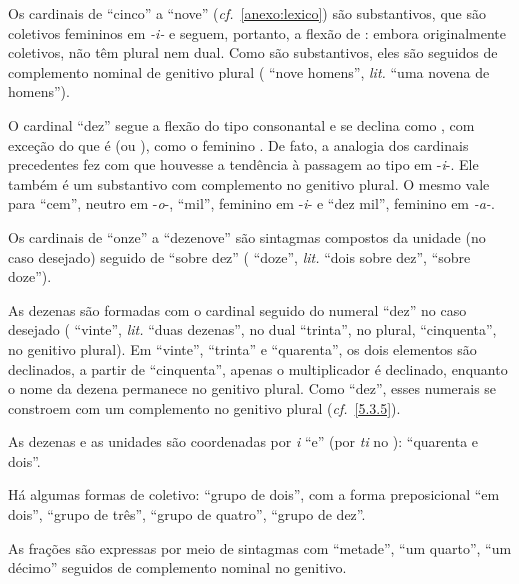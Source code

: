 Os cardinais de ``cinco'' a ``nove'' (\emph{cf.}~\autoref{anexo:lexico}) são
substantivos, que
são coletivos femininos em \emph{-i-} e seguem, portanto, a flexão de
: embora originalmente coletivos, não têm plural nem
dual. Como são substantivos, eles são seguidos de complemento nominal de
genitivo plural ( ``nove homens'', \emph{lit.}
``uma novena de homens'').

O cardinal  ``dez'' segue a flexão do tipo consonantal
e se declina como , com exceção do  que é
 (ou ), como o feminino . De
fato, a analogia dos cardinais precedentes fez com que houvesse a
tendência à passagem ao tipo em -\emph{i}-. Ele também é um substantivo
com complemento no genitivo plural. O mesmo vale para 
``cem'', neutro em -\emph{o}-,  ``mil'', feminino em
-\emph{i}- e  ``dez mil'', feminino em \emph{-a-}.

Os cardinais de ``onze'' a ``dezenove'' são sintagmas compostos da
unidade (no caso desejado) seguido de  ``sobre
dez'' ( ``doze'', \emph{lit.} ``dois
sobre dez'',   ``sobre doze'').

As dezenas são formadas com o cardinal seguido do numeral ``dez'' no
caso desejado ( ``vinte'', \emph{lit.} ``duas
dezenas'', no dual  ``trinta'', no
plural,  ``cinquenta'', no genitivo plural). Em
``vinte'', ``trinta'' e ``quarenta'', os dois elementos são declinados,
a partir de ``cinquenta'', apenas o multiplicador é declinado, enquanto
o nome da dezena permanece no genitivo plural. Como ``dez'', esses
numerais se constroem com um complemento no genitivo plural
(\emph{cf.}~\ref{5.3.5}).

As dezenas e as unidades são coordenadas por \emph{i} ``e'' (por
\emph{ti} no ): 
``quarenta e dois''.

Há algumas formas de coletivo:  ``grupo de dois'', com
a forma preposicional  ``em dois'',
 ``grupo de três'',  ``grupo de
quatro'',  ``grupo de dez''.

As frações são expressas por meio de sintagmas com 
``metade'',  ``um quarto'',  ``um
décimo'' seguidos de complemento nominal no genitivo.

